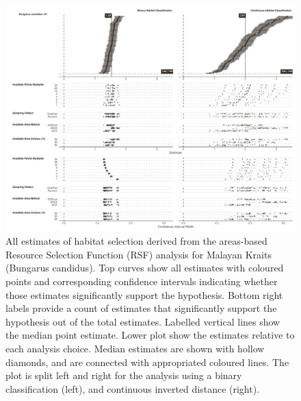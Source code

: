 \documentclass[10pt,a4paper]{article}
\begin{document}
\begin{figure}
\includegraphics[width=1\linewidth]{../../figures/specCurve_Bungarus candidus_rsf} \caption{All estimates of habitat selection derived from the areas-based Resource Selection Function (RSF) analysis for Malayan Kraits (Bungarus candidus). Top curves show all estimates with coloured points and corresponding confidence intervals indicating whether those estimates significantly support the hypothesis. Bottom right labels provide a count of estimates that significantly support the hypothesis out of the total estimates. Labelled vertical lines show the median point estimate. Lower plot show the estimates relative to each analysis choice. Median estimates are shown with hollow diamonds, and are connected with appropriated coloured lines. The plot is split left and right for the analysis using a binary classification (left), and continuous inverted distance (right).}\label{fig:specCurveRsfBUCA}
\end{figure}
\end{document}
